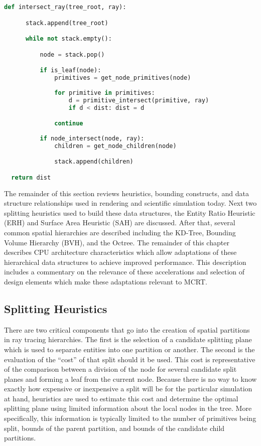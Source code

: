 \newpage

\begin{lstlisting}[language=Python,basicstyle=\tiny,caption={[A general spatial hierarchy traversal algorithm.]{General algorithm for spatial hierarchy traversal to return the nearest intersection along a ray.}},label={alg:bvh_traversal},captionpos=b]
  def intersect_ray(tree_root, ray):

      stack.append(tree_root)

      while not stack.empty():

          node = stack.pop()

          if is_leaf(node):
              primitives = get_node_primitives(node)
    
              for primitive in primitives:
                  d = primitive_intersect(primitive, ray)
                  if d < dist: dist = d

              continue
      
          if node_intersect(node, ray):
              children = get_node_children(node)

              stack.append(children)

  return dist
\end{lstlisting}

The remainder of this section reviews heuristics, bounding constructs, and data
structure relationships used in rendering and scientific simulation
today. Next two splitting heuristics used to build these data structures, the Entity Ratio Heuristic (ERH) and
Surface Area Heuristic (SAH) are discussed. After that, several common spatial
hierarchies are described including the KD-Tree, Bounding Volume Hierarchy
(BVH), and the Octree. The remainder of this chapter describes CPU architecture
characteristics which allow adaptations of these hierarchical data structures to
achieve improved performance. This description includes a commentary on the
relevance of these accelerations and selection of design elements which make
these adaptations relevant to MCRT.

\subsection{Splitting Heuristics}\label{sec:heuristics}

There are two critical components that go into the creation of spatial
partitions in ray tracing hierarchies. The first is the selection of a candidate
splitting plane which is used to separate entities into one partition or
another. The second is the evaluation of the ``cost'' of that split should it be
used. This cost is representative of the comparison between a division of the
node for several candidate split planes and forming a leaf from the current
node.  Because there is no way to know exactly how expensive or inexpensive a
split will be for the particular simulation at hand, heuristics are used to
estimate this cost and determine the optimal splitting plane using limited
information about the local nodes in the tree. More specifically, this
information is typically limited to the number of primitives being split, bounds
of the parent partition, and bounds of the candidate child partitions.

